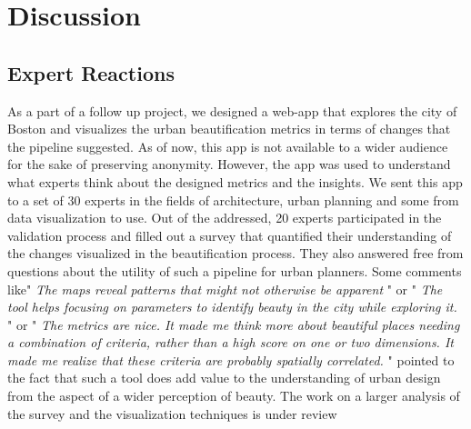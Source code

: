 \section{Discussion}

\subsection{Expert Reactions}
As a part of a follow up project, we designed a web-app that explores the city of Boston and visualizes the urban beautification metrics in terms of changes that the pipeline suggested. As of now, this app is not available to a wider audience for the sake of preserving anonymity. However, the app was used to understand what experts think about the designed metrics and the insights. We sent this app to a set of 30 experts in the fields of architecture, urban planning and some from data visualization to use. Out of the addressed, 20 experts participated in the validation process and filled out a survey that quantified their understanding of the changes visualized in the beautification process. They also answered free from questions about the utility of such a pipeline for urban planners. Some comments like" \textit{The maps reveal patterns that might not otherwise be apparent} " or " \textit{The tool helps focusing on parameters to identify beauty in the city while exploring it.} " or " \textit{The metrics are nice. It made me think more about beautiful places needing a combination of criteria, rather than a high score on one or two dimensions. It made me realize that these criteria are probably spatially correlated.} " pointed to the fact that such a tool does add value to the understanding of urban design from the aspect of a wider perception of beauty. The work on a larger analysis of the survey and the visualization techniques is under review

